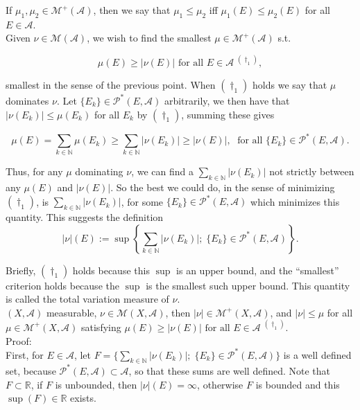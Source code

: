 \documentclass[12pt]{article}
\newcommand{\partset}[1]{ \mathcal{P}^{*}(#1) }
\newcommand{\fall}[0] { \textrm{ for all } }
\newcommand{\nats}[0] { \mathbb{N}}
\newcommand{\reals}[0] { \mathbb{R}}
\newcommand{\A}[0] { \mathcal{A} }
\newcommand{\M}[0] { \mathcal{M} }
\begin{document}
If $\mu_1,\mu_2 \in \M^+(\A)$, then we say that $\mu_1 \le \mu_2$ iff $\mu_1(E) \le \mu_2(E)$ for all $E \in \A$.\\

Given $\nu \in \M(\A)$, we wish to find the smallest $\mu \in \M^+(\A)$ s.t.

$$
     \mu(E)  \ge |\nu(E)| \fall E \in \A  \; {}^{(\dagger_1)},
$$
 
\noindent
smallest in the sense of the previous point. When ${(\dagger_1)}$ holds we say that $\mu$ dominates $\nu$.  Let $\{ E_k \} \in \partset{E,\A}$ arbitrarily, we then have that $|\nu(E_k)| \le \mu(E_k)$ for all $E_k$ by ${(\dagger_1)}$, summing these gives 

$$
\mu(E) = \sum_{k \in \nats} \mu(E_k) \ge \sum_{k \in \nats} |\nu(E_k)| \ge | \nu(E)|, \; \fall \{ E_k\} \in \partset{E, \A}.
$$

\noindent
Thus, for any $\mu$ dominating $\nu$, we can find a $\sum_{k \in \nats} |\nu(E_k)|$ not strictly between any $\mu(E)$ and $|\nu(E)|$. So the best we could do, in the sense of minimizing ${(\dagger_1)}$, is $\sum_{k \in \nats} |\nu(E_k)|$, for some $ \{ E_k\} \in \partset{E, \A}$ which minimizes this quantity. This suggests the definition\\

$$
|\nu|(E) := \sup \left\{  \sum_{k \in \nats} |\nu(E_k)| ; \; \{ E_k\} \in \partset{E, \A}  \right\}.
$$

\noindent   
Briefly, ${(\dagger_1)}$ holds because this $\sup$ is an upper bound, and the ``smallest'' criterion holds because the $\sup$ is the smallest such upper bound. This quantity is called the total variation measure of $\nu$. \\






$(X, \A)$ measurable, $\nu \in \M(X,\A)$, then $|\nu| \in \M^+(X, \A)$, and $|\nu| \le \mu$ for all $\mu  \in \M^+(X, \A)$ satisfying  $\mu(E)  \ge |\nu(E)| \fall E \in \A \; {}^{(\dagger_1)} $. \\


Proof: \\

\noindent
First, for $E \in \A$, let $ F = \{  \sum_{k \in \nats} |\nu(E_k)| ; \; \{ E_k\} \in \partset{E, \A}  \}$ is a well defined set, because $\partset{E, \A} \subset \A$, so that these sums are well defined. Note that $F \subset \reals$, if $F$ is unbounded, then $|\nu|(E) = \infty$, otherwise $F$ is bounded and this $\sup(F) \in \reals$ exists. \\
\end{document}
